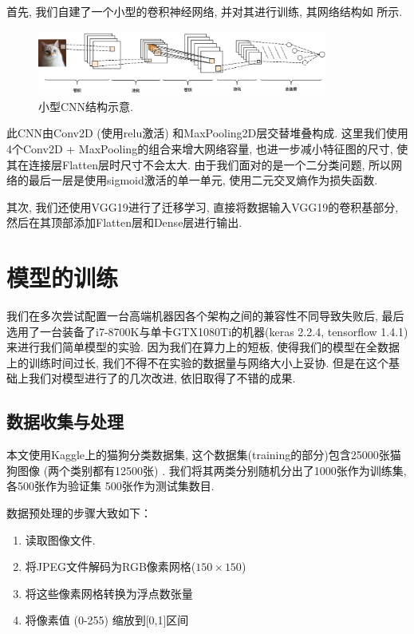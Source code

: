 \documentclass[lang=cn,11pt]{elegantpaper}
\begin{document}
首先, 我们自建了一个小型的卷积神经网络, 并对其进行训练, 其网络结构如  所示. 
\begin{figure}[hbtp]
	\centering
	  \includegraphics[width=0.85\textwidth]{cnn1.png}
	  \tiny
	  \caption{小型CNN结构示意.\label{fig:cnn1}}
\end{figure}
\normalsize
此CNN由Conv2D (使用relu激活) 和MaxPooling2D层交替堆叠构成. 这里我们使用4个Conv2D + MaxPooling的组合来增大网络容量, 也进一步减小特征图的尺寸, 使其在连接层Flatten层时尺寸不会太大. 由于我们面对的是一个二分类问题, 所以网络的最后一层是使用sigmoid激活的单一单元, 使用二元交叉熵作为损失函数. 

其次, 我们还使用VGG19进行了迁移学习, 直接将数据输入VGG19的卷积基部分, 然后在其顶部添加Flatten层和Dense层进行输出. 

\section{模型的训练}

我们在多次尝试配置一台高端机器因各个架构之间的兼容性不同导致失败后, 最后选用了一台装备了i7-8700K与单卡GTX1080Ti的机器(keras 2.2.4, tensorflow 1.4.1)来进行我们简单模型的实验. 因为我们在算力上的短板, 使得我们的模型在全数据上的训练时间过长, 我们不得不在实验的数据量与网络大小上妥协. 但是在这个基础上我们对模型进行了的几次改进, 依旧取得了不错的成果. 

\subsection{数据收集与处理}
本文使用Kaggle上的猫狗分类数据集, 这个数据集(training的部分)包含25000张猫狗图像 (两个类别都有12500张) . 我们将其两类分别随机分出了1000张作为训练集, 各500张作为验证集 500张作为测试集数目.

  数据预处理的步骤大致如下：

\begin{enumerate}
	\item 读取图像文件.
	\item 将JPEG文件解码为RGB像素网格($150\times 150$)
	\item 将这些像素网格转换为浮点数张量
	\item 将像素值 (0-255) 缩放到[0,1]区间
\end{enumerate}
\end{document}
